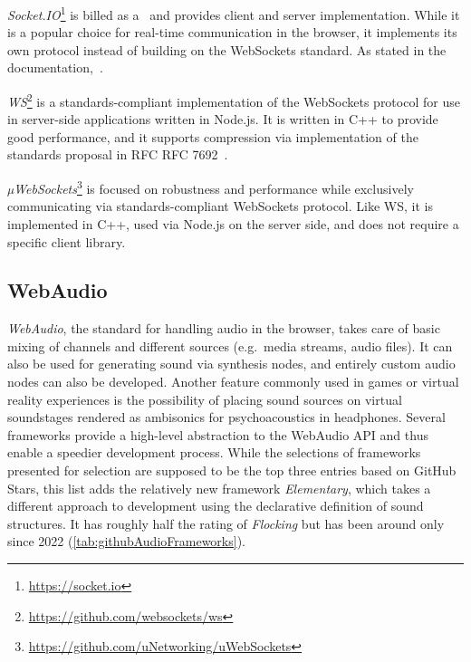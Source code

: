 

\emph{Socket.IO}\footnote{\url{https://socket.io}} is billed as a~ and provides client and server implementation.
While it is a popular choice for real-time communication in the browser, it implements its own protocol instead of building on the WebSockets standard.
As stated in the documentation,~.

\emph{WS}\footnote{\url{https://github.com/websockets/ws}} is a standards-compliant implementation of the WebSockets protocol for use in server-side applications written in Node.js.
It is written in C++ to provide good performance, and it supports compression via implementation of the standards proposal in \ac{RFC} RFC 7692~.

\emph{µWebSockets}\footnote{\url{https://github.com/uNetworking/uWebSockets}} is focused on robustness and performance while exclusively communicating via standards-compliant WebSockets protocol.
Like WS, it is implemented in C++, used via Node.js on the server side, and does not require a specific client library.

\subsection{WebAudio}

\emph{WebAudio}, the standard for handling audio in the browser, takes care of basic mixing of channels and different sources (e.g.\ media streams, audio files).
It can also be used for generating sound via synthesis nodes, and entirely custom audio nodes can also be developed.
Another feature commonly used in games or virtual reality experiences is the possibility of placing sound sources on virtual soundstages rendered as ambisonics for psychoacoustics in headphones.
Several frameworks provide a high-level abstraction to the WebAudio \ac{API} and thus enable a speedier development process.
While the selections of frameworks presented for selection are supposed to be the top three entries based on GitHub Stars, this list adds the relatively new framework \emph{Elementary}, which takes a different approach to development using the declarative definition of sound structures.
It has roughly half the rating of \emph{Flocking} but has been around only since 2022 (\ref{tab:githubAudioFrameworks}).

